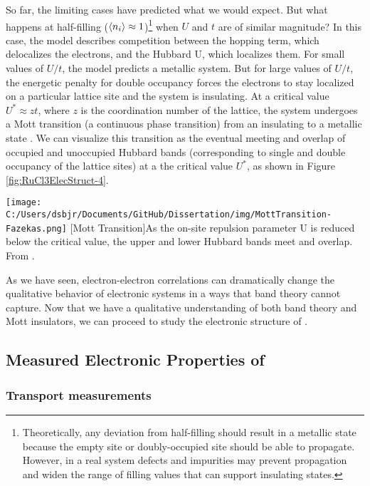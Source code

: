 So far, the limiting cases have predicted what we would expect. But what happens at half-filling ($\braket{n_{i}} \approx 1$)\footnote{Theoretically, any deviation from half-filling should result in a metallic state because the empty site or doubly-occupied site should be able to propagate. However, in a real system defects and impurities may prevent propagation and widen the range of filling values that can support insulating states.} when $U$ and $t$ are of similar magnitude? In this case, the model describes competition between the hopping term, which delocalizes the electrons, and the Hubbard U, which localizes them. For small values of $U/t$, the model predicts a metallic system. But for large values of $U/t$, the energetic penalty for double occupancy forces the electrons to stay localized on a particular lattice site and the system is insulating. At a critical value $U^{*} \approx z t$, where $z$ is the coordination number of the lattice, the system undergoes a Mott transition (a continuous phase transition) from an insulating to a metallic state \cite{Fazekas}. We can visualize this transition as the eventual meeting and overlap of occupied and unoccupied Hubbard bands (corresponding to single and double occupancy of the lattice sites) at a the critical value $U^{*}$, as shown in Figure \ref{fig:RuCl3ElecStruct-4}.

\begin{centering}
\texttt{[image: C:/Users/dsbjr/Documents/GitHub/Dissertation/img/MottTransition-Fazekas.png]}
  \captionsetup{width=0.75\textwidth}
  [Mott Transition]{As the on-site repulsion parameter U is reduced below the critical value, the upper and lower Hubbard bands meet and overlap. From \cite{Fazekas1990}.} 
  \label{fig:RuCl3ElecStruct-4}
\end{centering}

As we have seen, electron-electron correlations can dramatically change the qualitative behavior of electronic systems in a ways that band theory cannot capture. Now that we have a qualitative understanding of both band theory and Mott insulators, we can proceed to study the electronic structure of \ruclnospace .

\subsection{Measured Electronic Properties of \texorpdfstring{\rucl}{RuCl3}}

\subsubsection{Transport measurements}

